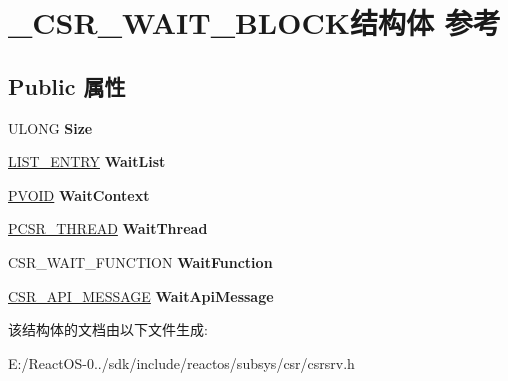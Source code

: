 \hypertarget{struct___c_s_r___w_a_i_t___b_l_o_c_k}{}\section{\+\_\+\+C\+S\+R\+\_\+\+W\+A\+I\+T\+\_\+\+B\+L\+O\+C\+K结构体 参考}
\label{struct___c_s_r___w_a_i_t___b_l_o_c_k}
\subsection*{Public 属性}
\begin{DoxyCompactItemize}
\item 
\mbox{\label{struct___c_s_r___w_a_i_t___b_l_o_c_k_a3883bf8ece84699b16e05d295560c98b}} 
U\+L\+O\+NG {\bfseries Size}
\item 
\mbox{\label{struct___c_s_r___w_a_i_t___b_l_o_c_k_a48daf33f6fabbdf129d251b4091e1d9b}} 
\hyperlink{struct___l_i_s_t___e_n_t_r_y}{L\+I\+S\+T\+\_\+\+E\+N\+T\+RY} {\bfseries Wait\+List}
\item 
\mbox{\label{struct___c_s_r___w_a_i_t___b_l_o_c_k_a01a90f5dc6f377e5ed791ab7b2fbaf89}} 
\hyperlink{interfacevoid}{P\+V\+O\+ID} {\bfseries Wait\+Context}
\item 
\mbox{\label{struct___c_s_r___w_a_i_t___b_l_o_c_k_a32dcd32591bf0774b066c4f28fb29176}} 
\hyperlink{struct___c_s_r___t_h_r_e_a_d}{P\+C\+S\+R\+\_\+\+T\+H\+R\+E\+AD} {\bfseries Wait\+Thread}
\item 
\mbox{\label{struct___c_s_r___w_a_i_t___b_l_o_c_k_ac256dc330bdb74a7c46d422c949d2d62}} 
C\+S\+R\+\_\+\+W\+A\+I\+T\+\_\+\+F\+U\+N\+C\+T\+I\+ON {\bfseries Wait\+Function}
\item 
\mbox{\label{struct___c_s_r___w_a_i_t___b_l_o_c_k_adef16d501fd4701f9c4ccf66d86e8638}} 
\hyperlink{struct___c_s_r___a_p_i___m_e_s_s_a_g_e}{C\+S\+R\+\_\+\+A\+P\+I\+\_\+\+M\+E\+S\+S\+A\+GE} {\bfseries Wait\+Api\+Message}
\end{DoxyCompactItemize}


该结构体的文档由以下文件生成\+:\begin{DoxyCompactItemize}
\item 
E\+:/\+React\+O\+S-\/0../sdk/include/reactos/subsys/csr/csrsrv.\+h\end{DoxyCompactItemize}
